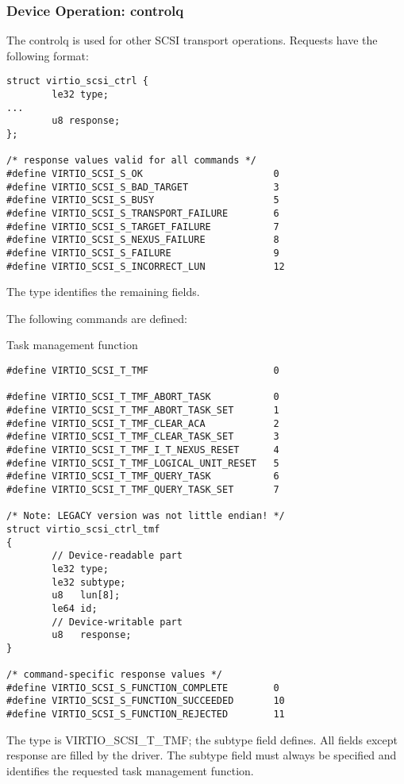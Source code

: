 \subsubsection{Device Operation: controlq}\label{sec:Device Types / SCSI Host Device / Device Operation / Device Operation: controlq}

The controlq is used for other SCSI transport operations.
Requests have the following format:

\begin{lstlisting}
struct virtio_scsi_ctrl {
        le32 type;
...
        u8 response;
};

/* response values valid for all commands */
#define VIRTIO_SCSI_S_OK                       0
#define VIRTIO_SCSI_S_BAD_TARGET               3
#define VIRTIO_SCSI_S_BUSY                     5
#define VIRTIO_SCSI_S_TRANSPORT_FAILURE        6
#define VIRTIO_SCSI_S_TARGET_FAILURE           7
#define VIRTIO_SCSI_S_NEXUS_FAILURE            8
#define VIRTIO_SCSI_S_FAILURE                  9
#define VIRTIO_SCSI_S_INCORRECT_LUN            12
\end{lstlisting}

The type identifies the remaining fields.

The following commands are defined:

  Task management function
\begin{lstlisting}
#define VIRTIO_SCSI_T_TMF                      0

#define VIRTIO_SCSI_T_TMF_ABORT_TASK           0
#define VIRTIO_SCSI_T_TMF_ABORT_TASK_SET       1
#define VIRTIO_SCSI_T_TMF_CLEAR_ACA            2
#define VIRTIO_SCSI_T_TMF_CLEAR_TASK_SET       3
#define VIRTIO_SCSI_T_TMF_I_T_NEXUS_RESET      4
#define VIRTIO_SCSI_T_TMF_LOGICAL_UNIT_RESET   5
#define VIRTIO_SCSI_T_TMF_QUERY_TASK           6
#define VIRTIO_SCSI_T_TMF_QUERY_TASK_SET       7

/* Note: LEGACY version was not little endian! */
struct virtio_scsi_ctrl_tmf
{
        // Device-readable part
        le32 type;
        le32 subtype;
        u8   lun[8];
        le64 id;
        // Device-writable part
        u8   response;
}

/* command-specific response values */
#define VIRTIO_SCSI_S_FUNCTION_COMPLETE        0
#define VIRTIO_SCSI_S_FUNCTION_SUCCEEDED       10
#define VIRTIO_SCSI_S_FUNCTION_REJECTED        11
\end{lstlisting}

  The type is VIRTIO_SCSI_T_TMF; the subtype field defines. All
  fields except response are filled by the driver. The subtype
  field must always be specified and identifies the requested
  task management function.

